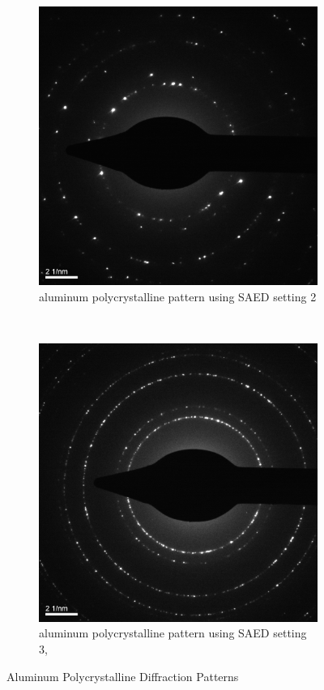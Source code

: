 \documentclass[12pt,a4paper]{article}
\begin{document}
\begin{figure}[htbp]
  \centering
    \begin{subfigure}[b]{0.45\textwidth}
    \includegraphics[width=\textwidth]{data/Image1 Al_Diff_SAED2.png}
    \caption{aluminum polycrystalline pattern using SAED setting 2}
    \label{fig:al2}
  \end{subfigure}%
  ~
  \begin{subfigure}[b]{0.45\textwidth}
    \includegraphics[width=\textwidth]{data/Image2Al_Diff_SAED3.png}
    \caption{aluminum polycrystalline pattern using SAED setting 3, }
    \label{fig:al3}
  \end{subfigure}
  \caption{Aluminum Polycrystalline Diffraction Patterns}
  \label{fig:aluminum}
\end{figure}
\end{document}
